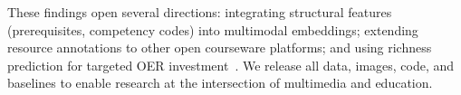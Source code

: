 \documentclass[sigconf,review]{acmart}
\begin{document}
These findings open several directions: integrating structural features (prerequisites, competency codes) into multimodal embeddings; extending resource annotations to other open courseware platforms; and using richness prediction for targeted OER investment~\cite{wiley2014oerdefinition,unesco2019oer}.
We release all data, images, code, and baselines to enable research at the intersection of multimedia and education.





\end{document}
